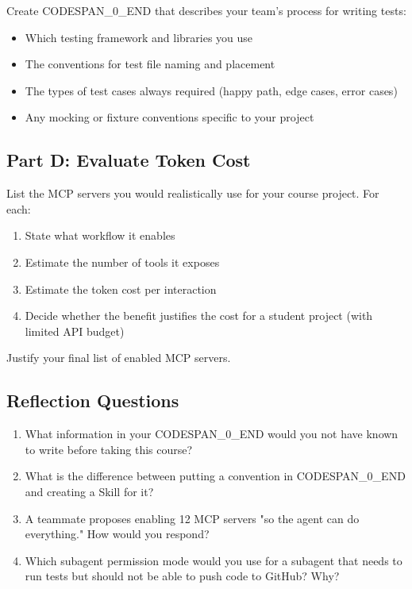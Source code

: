 \documentclass[11pt,a4paper]{book}
\begin{document}
Create CODESPAN\_0\_END that describes your team's process for writing tests:

\begin{itemize}
  \item Which testing framework and libraries you use
  \item The conventions for test file naming and placement
  \item The types of test cases always required (happy path, edge cases, error cases)
  \item Any mocking or fixture conventions specific to your project
\end{itemize}

\subsection{Part D: Evaluate Token Cost}

List the MCP servers you would realistically use for your course project. For each:

\begin{enumerate}
  \item State what workflow it enables
  \item Estimate the number of tools it exposes
  \item Estimate the token cost per interaction
  \item Decide whether the benefit justifies the cost for a student project (with limited API budget)
\end{enumerate}

Justify your final list of enabled MCP servers.

\subsection{Reflection Questions}

\begin{enumerate}
  \item What information in your CODESPAN\_0\_END would you not have known to write before taking this course?
  \item What is the difference between putting a convention in CODESPAN\_0\_END and creating a Skill for it?
  \item A teammate proposes enabling 12 MCP servers "so the agent can do everything." How would you respond?
  \item Which subagent permission mode would you use for a subagent that needs to run tests but should not be able to push code to GitHub? Why?
\end{enumerate}
\end{document}
